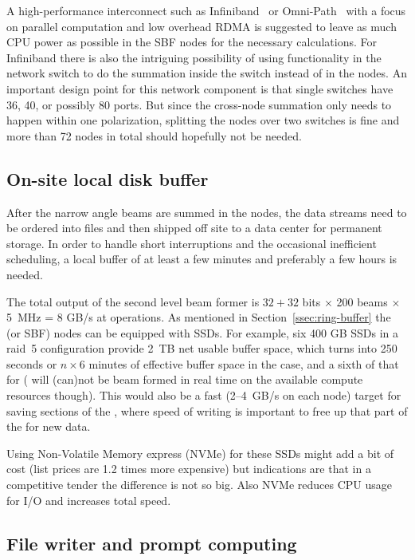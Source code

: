 \documentclass[12pt,a4paper]{article}
\begin{document}
A high-performance interconnect such as Infiniband~\cite{infiniband} or Omni-Path~\cite{omnipath} with a focus on parallel computation and low overhead RDMA is suggested to leave as much CPU power as possible in the SBF nodes for the necessary calculations. 
For Infiniband there is also the intriguing possibility of using functionality in the network switch to do the summation inside the switch instead of in the nodes. 
An important design point for this network component is that single switches have 36, 40, or possibly 80 ports. 
But since the cross-node summation only needs to happen within one polarization, splitting the nodes over two switches is fine and more than 72 nodes in total should hopefully not be needed.
\fi

\subsection{On-site local disk buffer}
\label{ssec:disk-buffer}
After the narrow angle beams are summed in the \RB nodes, the data streams need to be ordered into files and then shipped off site to a data center for permanent storage. 
In order to handle short interruptions and the occasional inefficient scheduling, a local buffer of at least a few minutes and preferably a few hours is needed.

The total output of the second level beam former is $32+32$ bits $\times$ 200 beams $\times$ 5~MHz = 8 GB/s 
at \NBW{} operations. 
As mentioned in Section~\ref{ssec:ring-buffer} the \RB (or SBF) nodes can be equipped with SSDs.
For example, six 400 GB SSDs in a raid~5 configuration provide 2~TB net usable buffer space, which turns into 250 seconds or $n\times 6$ minutes of effective buffer space in the \NBW{} case, and a sixth of that for \WBW{} (\WBW{} will (can)not be beam formed in real time on the available compute resources though). 
This would also be a fast (2--4~GB/s on each node) target for saving sections of the \RB, where speed of writing is important to free up that part of the \RB for new data.

Using Non-Volatile Memory express (NVMe) for these SSDs might add a bit of cost (list prices are 1.2 times more expensive) but indications are that in a competitive tender the difference is not so big.
Also NVMe reduces CPU usage for I/O and increases total speed.

\subsection{File writer and prompt computing}
\label{ssec-fw-prompt}
\end{document}
